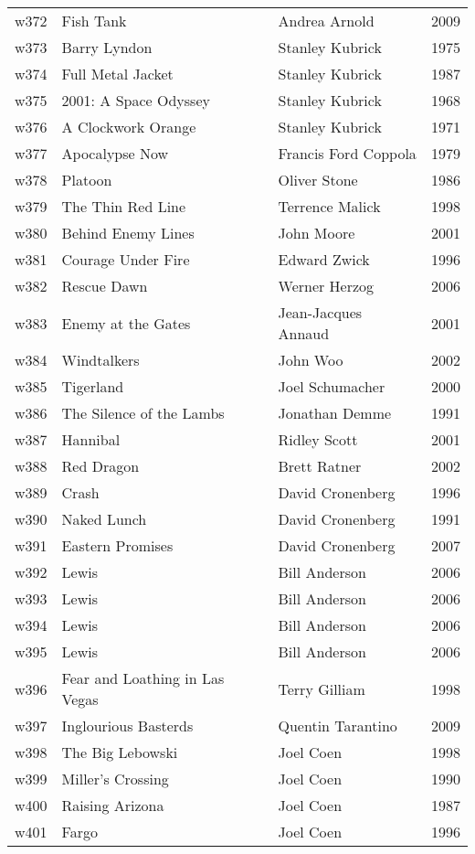 \documentclass{article}
\begin{document}
\begin {center}
\begin{longtable}{l p{10cm} l l}
w372 & Fish Tank & Andrea Arnold & 2009 \\
w373 & Barry Lyndon & Stanley Kubrick & 1975 \\
w374 & Full Metal Jacket & Stanley Kubrick & 1987 \\
w375 & 2001: A Space Odyssey & Stanley Kubrick & 1968 \\
w376 & A Clockwork Orange & Stanley Kubrick & 1971 \\
w377 & Apocalypse Now & Francis Ford Coppola & 1979 \\
w378 & Platoon & Oliver Stone & 1986 \\
w379 & The Thin Red Line & Terrence Malick & 1998 \\
w380 & Behind Enemy Lines & John Moore & 2001 \\
w381 & Courage Under Fire & Edward Zwick & 1996 \\
w382 & Rescue Dawn & Werner Herzog & 2006 \\
w383 & Enemy at the Gates & Jean-Jacques Annaud & 2001 \\
w384 & Windtalkers & John Woo & 2002 \\
w385 & Tigerland & Joel Schumacher & 2000 \\
w386 & The Silence of the Lambs & Jonathan Demme & 1991 \\
w387 & Hannibal & Ridley Scott & 2001 \\
w388 & Red Dragon & Brett Ratner & 2002 \\
w389 & Crash & David Cronenberg & 1996 \\
w390 & Naked Lunch & David Cronenberg & 1991 \\
w391 & Eastern Promises & David Cronenberg & 2007 \\
w392 & Lewis & Bill Anderson & 2006 \\
w393 & Lewis & Bill Anderson & 2006 \\
w394 & Lewis & Bill Anderson & 2006 \\
w395 & Lewis & Bill Anderson & 2006 \\
w396 & Fear and Loathing in Las Vegas & Terry Gilliam & 1998 \\
w397 & Inglourious Basterds & Quentin Tarantino & 2009 \\
w398 & The Big Lebowski & Joel Coen & 1998 \\
w399 & Miller's Crossing & Joel Coen & 1990 \\
w400 & Raising Arizona & Joel Coen & 1987 \\
w401 & Fargo & Joel Coen & 1996 \\

\end{longtable}
\end{center}
\end{document}
